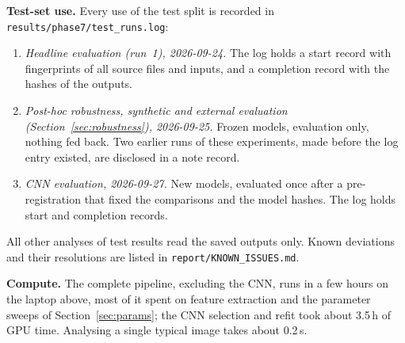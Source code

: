 \textbf{Test-set use.} Every use of the test split is recorded in \texttt{results/phase7/test\_runs.log}:
\begin{enumerate}\setlength\itemsep{0pt}
\item \emph{Headline evaluation (run~1), 2026-09-24.} The log holds a start record with fingerprints of all source
files and inputs, and a completion record with the hashes of the outputs.
\item \emph{Post-hoc robustness, synthetic and external evaluation (Section~\ref{sec:robustness}), 2026-09-25.} Frozen models,
evaluation only, nothing fed back. Two earlier runs of these experiments, made before the log entry existed, are disclosed in a
note record.
\item \emph{CNN evaluation, 2026-09-27.} New models, evaluated once after a pre-registration that fixed the
comparisons and the model hashes. The log holds start and completion records.
\end{enumerate}
All other analyses of test results read the saved outputs only. Known deviations and their resolutions are listed in
\texttt{report/KNOWN\_ISSUES.md}.

\textbf{Compute.} The complete pipeline, excluding the CNN, runs in a few hours on the laptop above, most of it
spent on feature extraction and the parameter sweeps of Section~\ref{sec:params}; the CNN selection and refit took about 3.5\,h of GPU
time. Analysing a single typical image takes about 0.2\,s.
